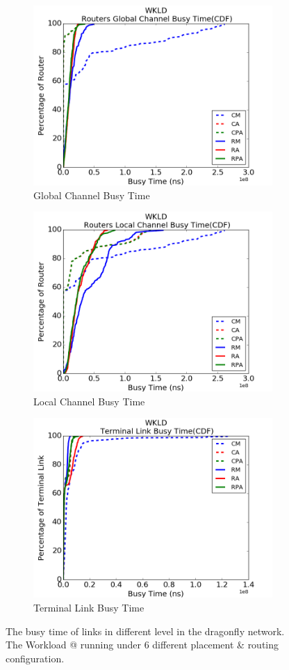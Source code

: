 \documentclass[conference,compsoc]{IEEEtran}
\makeatletter
\newcommand{\Rmnum}[1]{\expandafter\@slowromancap\romannumeral #1@}
\makeatother
\begin{document}
\begin{figure}[t!]
    \centering   
    \begin{subfigure}[t]{0.32\textwidth}
        \centering
        \includegraphics[height=1.8 in]{wkld/gc-stime}
        \caption{Global Channel Busy Time}
        \label{fig:global-channel-stime}
    \end{subfigure}%
     \hspace{1em}%
    \begin{subfigure}[t]{0.32\textwidth}
        \centering
        \includegraphics[height=1.8 in]{wkld/lc-stime}
        \caption{Local Channel Busy Time}
        \label{fig:local-channel-stime}
    \end{subfigure}%
    \hspace{1em}%
    \begin{subfigure}[t]{0.32\textwidth}
        \centering
        \includegraphics[height=1.8 in]{wkld/tl-stime}
        \caption{Terminal Link Busy Time}
        \label{fig:terminal-link-stime}
    \end{subfigure}%
   \caption{The busy time of links in different level in the dragonfly network. The Workload \Rmnum{1} running under 6 different placement \& routing configuration.}
   \label{fig:wkld-network-stime}
\end{figure}
\end{document}
